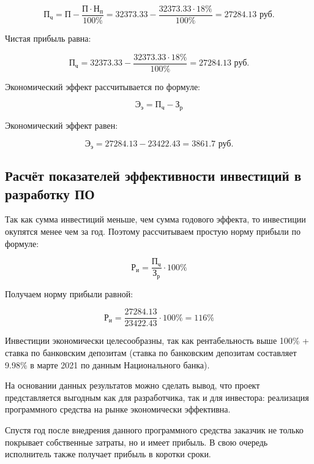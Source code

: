 \begin{equation}
    \textit{П}_\textit{ч} = \textit{П} - \frac{\textit{П} \cdot \textit{Н}_\textit{п}}{100\%} = 32373.33 - \frac{32373.33 \cdot 18\%}{100\%} = 27284.13 \textrm{ руб.}
\end{equation}

Чистая прибыль равна:

\begin{equation*}
    \textit{П}_\textit{ч} = 32373.33 - \frac{32373.33 \cdot 18\%}{100\%} = 27284.13 \textrm{ руб.}
\end{equation*}

Экономический эффект рассчитывается по формуле:

\begin{equation}
    \textit{Э}_\textit{э} = \textit{П}_\textit{ч} - \textit{З}_\textit{р}
\end{equation}

Экономический эффект равен:

\begin{equation*}
    \textit{Э}_\textit{э} = 27284.13 - 23422.43 = 3861.7 \textrm{ руб.}
\end{equation*}

\subsection{Расчёт показателей эффективности инвестиций в разработку ПО}

Так как сумма инвестиций меньше, чем сумма годового эффекта, то инвестиции окупятся менее чем за год. Поэтому рассчитываем простую норму прибыли по формуле:

\begin{equation}
    \textit{Р}_\textit{и} = \frac{\textit{П}_\textit{ч}}{\textit{З}_\textit{р}} \cdot 100\%
\end{equation}

Получаем норму прибыли равной:

\begin{equation*}
    \textit{Р}_\textit{и} = \frac{27284.13}{23422.43} \cdot 100\% = 116\%
\end{equation*}

Инвестиции экономически целесообразны, так как рентабельность выше 100\% + ставка по банковским депозитам (ставка по банковским депозитам  составляет 9.98\% в марте 2021 по данным Национального банка).

На основании данных результатов можно сделать вывод, что проект представляется выгодным как для разработчика, так и для инвестора: реализация программного средства на рынке экономически эффективна.

Спустя год после внедрения данного программного средства заказчик не только покрывает собственные затраты, но и имеет прибыль. В свою очередь исполнитель также получает прибыль в коротки сроки.
